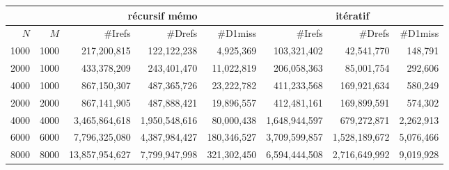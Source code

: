 \documentclass[10pt,a4paper]{article}
\begin{document}
\begin{center}
    {\footnotesize
    \begin{tabular}{|r|r||r|r|r||r|r|r||}
    \hline
     \multicolumn{2}{|c||}{ } 
    & \multicolumn{3}{c||}{récursif mémo}
    & \multicolumn{3}{c||}{itératif}
    \\ \hline
    $N$ & $M$ 
    & \#Irefs & \#Drefs & \#D1miss %
    & \#Irefs & \#Drefs & \#D1miss %
    \\ \hline
    \hline
    1000 & 1000 
    & 217,200,815 & 122,122,238 & 4,925,369  %
    & 103,321,402 & 42,541,770 & 148,791  %
    \\ \hline
    2000 & 1000 
    & 433,378,209 & 243,401,470 & 11,022,819  %
    & 206,058,363 & 85,001,754 & 292,606  %
    \\ \hline
    4000 & 1000 
    & 867,150,307 & 487,365,726 & 23,222,782  %
    & 411,233,568 & 169,921,634 & 580,249  %
    \\ \hline
    2000 & 2000 
    & 867,141,905 & 487,888,421 & 19,896,557  %
    & 412,481,161 & 169,899,591 & 574,302  %
    \\ \hline
    4000 & 4000 
    & 3,465,864,618 & 1,950,548,616 & 80,000,438  %
    & 1,648,944,597 & 679,272,871 & 2,262,913  %
    \\ \hline
    6000 & 6000 
    & 7,796,325,080 & 4,387,984,427 & 180,346,527  %
    & 3,709,599,857 & 1,528,189,672 & 5,076,466  %
    \\ \hline
    8000 & 8000 
    & 13,857,954,627 & 7,799,947,998 & 321,302,450  %
    & 6,594,444,508 & 2,716,649,992 & 9,019,928  %
    \\ \hline
    \hline
    \end{tabular}
    }

    \medskip
    

\end{center}
\end{document}
